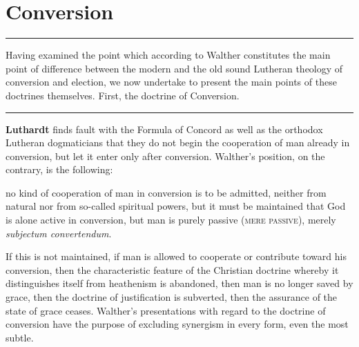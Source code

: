 \chapter{Conversion}
\hrule
\vspace{.30cm}
Having examined the point which according to Walther constitutes the main point of difference between the modern and the old sound Lutheran theology of conversion and election, we now undertake to present the main points of these doctrines themselves.  First, the doctrine of Conversion.
\vspace{.30cm}
\hrule
\vspace{1.25cm}
     \textbf{Luthardt} finds fault with the Formula of Concord as well as the orthodox Lutheran dogmaticians that they do not begin the cooperation of man already in conversion, but let it enter only after conversion.  Walther’s position, on the contrary, is the following: \begin{displayquote}{\footnotesize no kind of cooperation of man in conversion is to be admitted, neither from natural nor from so-called spiritual powers, but it must be maintained that God is alone active in conversion, but man is purely passive {\scriptsize\textsc{(mere passive)}}, merely \textit{subjectum convertendum}.}\end{displayquote}  If this is not maintained, if man is allowed to cooperate or contribute toward his conversion, then the characteristic feature of the Christian doctrine whereby it distinguishes itself from heathenism is  abandoned, then man is no longer saved by grace, then the doctrine of justification is subverted, then the assurance of the state of grace ceases.  Walther’s presentations with regard to the doctrine of conversion have the purpose of excluding synergism in every form, even the most subtle.

